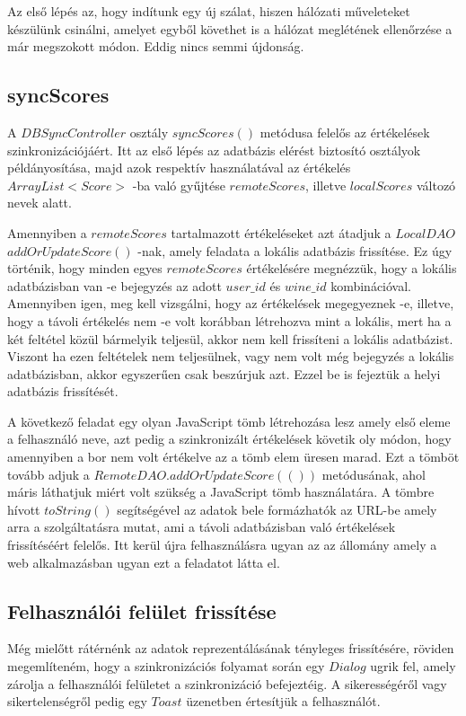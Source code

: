 \documentclass[12pt]{report}
\theoremstyle{definition}
\begin{document}
	Az első lépés az, hogy indítunk egy új szálat, hiszen hálózati műveleteket készülünk csinálni, amelyet egyből követhet is a hálózat meglétének ellenőrzése a már megszokott módon. Eddig nincs semmi újdonság.
	
	\subsection{syncScores}
	A $DBSyncController$ osztály $syncScores\left(\right)$ metódusa felelős az értékelések szinkronizációjáért. Itt az első lépés az adatbázis elérést biztosító osztályok példányosítása, majd azok respektív használatával az értékelés $ArrayList<Score>$ -ba való gyűjtése \linebreak$remoteScores$, illetve $localScores$ változó nevek alatt.
	
	Amennyiben a $remoteScores$ tartalmazott értékeléseket azt átadjuk a $LocalDAO$ \linebreak$addOrUpdateScore\left(\right)$ -nak, amely feladata a lokális adatbázis frissítése. Ez úgy történik, hogy minden egyes $remoteScores$ értékelésére megnézzük, hogy a lokális adatbázisban van -e bejegyzés az adott $user\_id$ és $wine\_id$ kombinációval. Amennyiben igen, meg kell vizsgálni, hogy az értékelések megegyeznek -e, illetve, hogy a távoli értékelés nem -e volt korábban létrehozva mint a lokális, mert ha a két feltétel közül bármelyik teljesül, akkor nem kell frissíteni a lokális adatbázist. Viszont ha ezen feltételek nem teljesülnek, vagy nem volt még bejegyzés a lokális adatbázisban, akkor egyszerűen csak beszúrjuk azt. Ezzel be is fejeztük a helyi adatbázis frissítését.
	
	A következő feladat egy olyan JavaScript tömb létrehozása lesz amely első eleme a felhasználó neve, azt pedig a szinkronizált értékelések követik oly módon, hogy amennyiben a bor nem volt értékelve az a tömb elem üresen marad. Ezt a tömböt tovább adjuk a $RemoteDAO.addOrUpdateScore\left(()\right)$ metódusának, ahol máris láthatjuk miért volt szükség a JavaScript tömb használatára. A tömbre hívott $toString\left(\right)$ segítségével az adatok bele formázhatók az URL-be amely arra a szolgáltatásra mutat, ami a távoli adatbázisban való értékelések frissítéséért felelős. Itt kerül újra felhasználásra ugyan az az állomány amely a web alkalmazásban ugyan ezt a feladatot látta el.
	
	\subsection{Felhasználói felület frissítése}
	Még mielőtt rátérnénk az adatok reprezentálásának tényleges frissítésére, röviden megemlíteném, hogy a szinkronizációs folyamat során egy $Dialog$ ugrik fel, amely zárolja a felhasználói felületet a szinkronizáció befejeztéig. A sikerességéről vagy sikertelenségről pedig egy $Toast$ üzenetben értesítjük a felhasználót.
	
\end{document}

